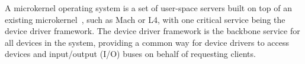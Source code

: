 A microkernel operating system is a set of user-space servers built on top of
an existing microkernel~\cite{stallings2005}, such as Mach or L4, with one
critical service being the device driver framework.  The device driver
framework is the backbone service for all devices in the system, providing
a common way for device drivers to access devices and input/output (I/O)
buses on behalf of requesting clients.  
%
%
%
%
%
%
%
%
